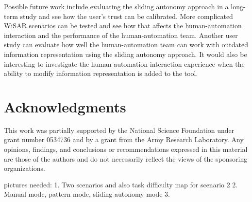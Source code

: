 \documentclass[journal]{IEEEtran}
\begin{document}
Possible future work include evaluating the sliding autonomy approach in a long-term study and see how the user's trust can be calibrated. More complicated WiSAR scenarios can be tested and see how that affects the human-automation interaction and the performance of the human-automation team. Another user study can evaluate how well the human-automation team can work with outdated information representation using the sliding autonomy approach. It would also be interesting to investigate the human-automation interaction experience when the ability to modify information representation is added to the tool.

\section*{Acknowledgments}

This work was partially supported by 
the National Science Foundation 
under grant number 
0534736 
and by a grant from
the Army Research Laboratory.
Any opinions, findings, and conclusions or recommendations expressed in this material are those of the authors and do not necessarily reflect the views of the sponsoring organizations.






pictures needed:
1. Two scenarios and also task difficulty map for scenario 2
2. Manual mode, pattern mode, sliding autonomy mode
3. 


\end{document}
